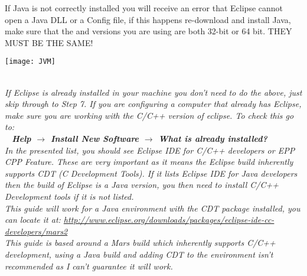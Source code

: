 {{{\begin{minipage}{0.9\textwidth}
\justifying
\color{Red}
{If Java is not correctly installed you will receive an error that Eclipse cannot open a Java DLL or a Config file, if this happens re-download and install Java, make sure that the \underline{} and \underline{} versions you are using are both 32-bit or 64 bit. THEY MUST BE THE SAME!}
\par
\centering
\texttt{[image: JVM]}
\end{minipage}
}
\\
\justifying
\emph{
If Eclipse is already installed in your machine you don’t need to do the above, just skip through to Step 7. If you are configuring a computer that already has Eclipse, make sure you are working with the C/C++ version of eclipse. To check this go to:
\\
\-\ \hspace{20pt} \textbf{Help $\rightarrow$ Install New Software $\rightarrow$ What is already installed?}
\\
In the presented list, you should see Eclipse IDE for C/C++ developers or EPP CPP Feature. These are very important as it means the Eclipse build inherently supports CDT (C Development Tools). If it lists Eclipse IDE for Java developers then the build of Eclipse is a Java version, you then need to install C/C++ Development tools if it is not listed.
\\
This guide will work for a Java environment with the CDT package installed, you can locate it at:
\url{http://www.eclipse.org/downloads/packages/eclipse-ide-cc-developers/mars2}
\\
This guide is based around a Mars build which inherently supports C/C++ development, using a Java build and adding CDT to the environment isn't recommended as I can't guarantee it will work.
}
\newpage
}}
